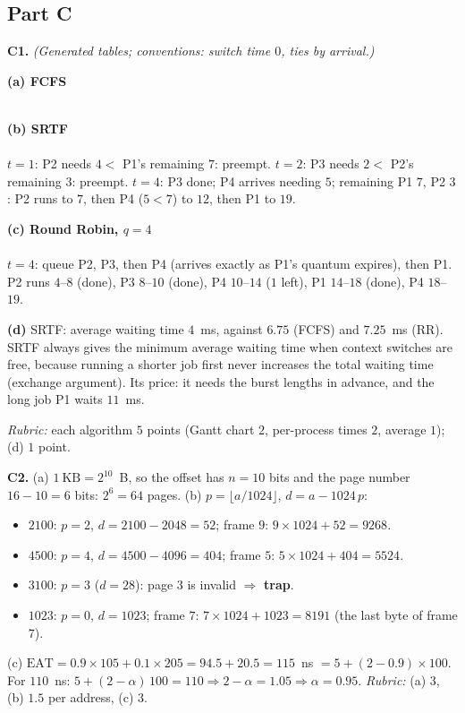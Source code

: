 \documentclass[11pt,a4paper]{article}
\begin{document}
\subsection*{Part C}
\textbf{C1.} \textit{(Generated tables; conventions: switch time $0$, ties by arrival.)}

\textbf{(a) FCFS}\\[0.2em]
\\[0.3em]
{\small{}}

\textbf{(b) SRTF}\\[0.2em]
\\[0.3em]
$t=1$: P2 needs $4 <$ P1's remaining $7$: preempt. $t=2$: P3 needs $2 <$ P2's remaining $3$: preempt. $t=4$: P3 done; P4 arrives needing $5$; remaining P1 $7$, P2 $3$: P2 runs to $7$, then P4 ($5 < 7$) to $12$, then P1 to $19$.\\
{\small{}}

\textbf{(c) Round Robin, $q = 4$}\\[0.2em]
\\[0.3em]
$t=4$: queue P2, P3, then P4 (arrives exactly as P1's quantum expires), then P1. P2 runs $4$--$8$ (done), P3 $8$--$10$ (done), P4 $10$--$14$ ($1$ left), P1 $14$--$18$ (done), P4 $18$--$19$.\\
{\small{}}

\textbf{(d)} SRTF: average waiting time $4$~ms, against $6.75$ (FCFS) and $7.25$~ms (RR). SRTF always gives the minimum average waiting time when context switches are free, because running a shorter job first never increases the total waiting time (exchange argument). Its price: it needs the burst lengths in advance, and the long job P1 waits $11$~ms.

\textit{Rubric:} each algorithm $5$ points (Gantt chart $2$, per-process times $2$, average $1$); (d) $1$ point.

\textbf{C2.} (a) $1\ \text{KB} = 2^{10}$~B, so the offset has $n = 10$ bits and the page number $16 - 10 = 6$ bits: $2^{6} = 64$ pages.
(b) $p = \lfloor a/1024 \rfloor$, $d = a - 1024\,p$:
\begin{itemize}
  \item $2100$: $p = 2$, $d = 2100 - 2048 = 52$; frame $9$: $9 \times 1024 + 52 = 9268$.
  \item $4500$: $p = 4$, $d = 4500 - 4096 = 404$; frame $5$: $5 \times 1024 + 404 = 5524$.
  \item $3100$: $p = 3$ ($d = 28$): page $3$ is invalid $\Rightarrow$ \textbf{trap}.
  \item $1023$: $p = 0$, $d = 1023$; frame $7$: $7 \times 1024 + 1023 = 8191$ (the last byte of frame $7$).
\end{itemize}
(c) $\text{EAT} = 0.9 \times 105 + 0.1 \times 205 = 94.5 + 20.5 = 115$~ns $= 5 + (2 - 0.9)\times100$. For $110$~ns: $5 + (2-\alpha)\,100 = 110 \Rightarrow 2 - \alpha = 1.05 \Rightarrow \alpha = 0.95$.
\textit{Rubric:} (a) $3$, (b) $1.5$ per address, (c) $3$.
\end{document}
